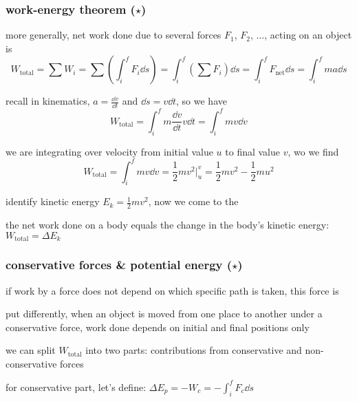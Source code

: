 \subsubsection{work-energy theorem ($\star$)}

more generally, net work done due to several forces $F_1$, $F_2$, $\dots$, acting on an object is
\begin{equation*}
W_\text{total} = \sum W_i = \sum \left(\int_i^f F_i \dd s\right) = \int_i^f \left(\sum F_i \right)\dd s = \int_i^f F_\text{net} \dd s = \int_i^f ma \dd s
\end{equation*}

recall in kinematics, $a=\frac{\dd v}{\dd t}$ and $\dd s = v \dd t$, so we have
\begin{equation*}
W_\text{total} = \int_i^f m \frac{\dd v}{\dd t} v \dd t = \int_i^f m v \dd v
\end{equation*}

we are integrating over velocity from initial value $u$ to final value $v$, wo we find
\begin{equation*}
W_\text{total} = \int_i^f m v \dd v = \frac{1}{2}mv^2 \Big|_u^v = \frac{1}{2}mv^2 - \frac{1}{2}mu^2
\end{equation*}

identify kinetic energy $E_k = \frac{1}{2}mv^2$, now we come to the   

\begin{ilight}
	the net work done on a body equals the change in the body's kinetic energy: $\boxed{W_\text{total} = \Delta E_k}$
\end{ilight}



\subsubsection{conservative forces \& potential energy ($\star$)}


if work by a force does not depend on which specific path is taken, this force is 

put differently, when an object is moved from one place to another under a conservative force, work done depends on initial and final positions only

we can split $W_\text{total}$ into two parts: contributions from conservative and non-conservative forces

for conservative part, let's define: $\Delta E_p = - W_{c} = - \int_i^f F_c \dd s $


